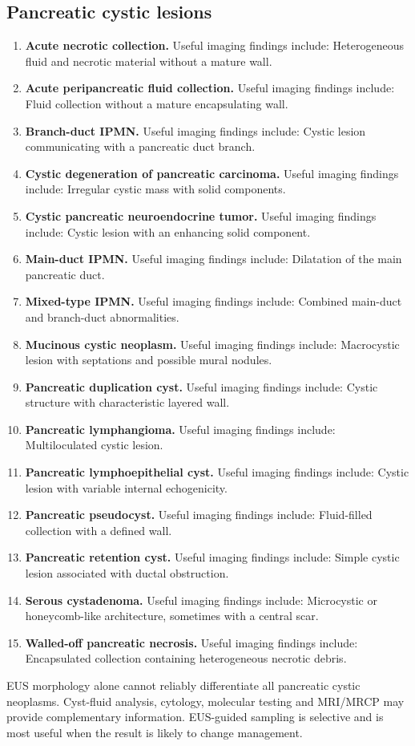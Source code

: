 \subsection{Pancreatic cystic lesions}
\begin{enumerate}[leftmargin=*,itemsep=0.45em,topsep=0.4em]
\item \textbf{Acute necrotic collection.} Useful imaging findings include: Heterogeneous fluid and necrotic material without a mature wall.
\item \textbf{Acute peripancreatic fluid collection.} Useful imaging findings include: Fluid collection without a mature encapsulating wall.
\item \textbf{Branch-duct IPMN.} Useful imaging findings include: Cystic lesion communicating with a pancreatic duct branch.
\item \textbf{Cystic degeneration of pancreatic carcinoma.} Useful imaging findings include: Irregular cystic mass with solid components.
\item \textbf{Cystic pancreatic neuroendocrine tumor.} Useful imaging findings include: Cystic lesion with an enhancing solid component.
\item \textbf{Main-duct IPMN.} Useful imaging findings include: Dilatation of the main pancreatic duct.
\item \textbf{Mixed-type IPMN.} Useful imaging findings include: Combined main-duct and branch-duct abnormalities.
\item \textbf{Mucinous cystic neoplasm.} Useful imaging findings include: Macrocystic lesion with septations and possible mural nodules.
\item \textbf{Pancreatic duplication cyst.} Useful imaging findings include: Cystic structure with characteristic layered wall.
\item \textbf{Pancreatic lymphangioma.} Useful imaging findings include: Multiloculated cystic lesion.
\item \textbf{Pancreatic lymphoepithelial cyst.} Useful imaging findings include: Cystic lesion with variable internal echogenicity.
\item \textbf{Pancreatic pseudocyst.} Useful imaging findings include: Fluid-filled collection with a defined wall.
\item \textbf{Pancreatic retention cyst.} Useful imaging findings include: Simple cystic lesion associated with ductal obstruction.
\item \textbf{Serous cystadenoma.} Useful imaging findings include: Microcystic or honeycomb-like architecture, sometimes with a central scar.
\item \textbf{Walled-off pancreatic necrosis.} Useful imaging findings include: Encapsulated collection containing heterogeneous necrotic debris.
\end{enumerate}
EUS morphology alone cannot reliably differentiate all pancreatic cystic neoplasms. Cyst-fluid analysis, cytology, molecular testing and MRI/MRCP may provide complementary information. EUS-guided sampling is selective and is most useful when the result is likely to change management.

